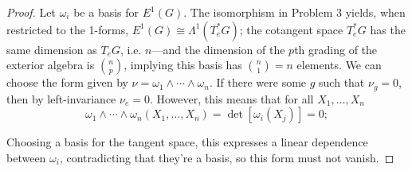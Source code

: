 \documentclass{article}
\begin{document}
\begin{proof}
  Let $\omega_{i}$ be a basis for $E^{1}(G)$.
  The isomorphism in Problem 3 yields, when restricted to the 1-forms, $E^{1}(G) \cong \Lambda^{1}(T_{e}^{*}G)$;
  the cotangent space $T_{e}^{*}G$ has the same dimension as $T_{e}G$, i.e. $n$---and
  the dimension of the $p$th grading of the exterior algebra is $\binom{n}{p}$, implying this basis has $\binom{n}{1} = n$ elements.
  We can choose the form given by $\nu = \omega_{1} \wedge \cdots \wedge \omega_{n}$.
  If there were some $g$ such that $\nu_{g} = 0$, then by left-invariance $\nu_{e} = 0$.
  However, this means that for all $X_{1}, \ldots, X_{n}$
  \[
    \omega_{1} \wedge \cdots \wedge \omega_{n}(X_{1}, \ldots, X_{n}) = \det[\omega_{i}(X_{j})] = 0;
  \]

  Choosing a basis for the tangent space, this expresses a linear dependence between $\omega_{i}$, contradicting that they're a basis,
  so this form must not vanish.
\end{proof}
\end{document}
